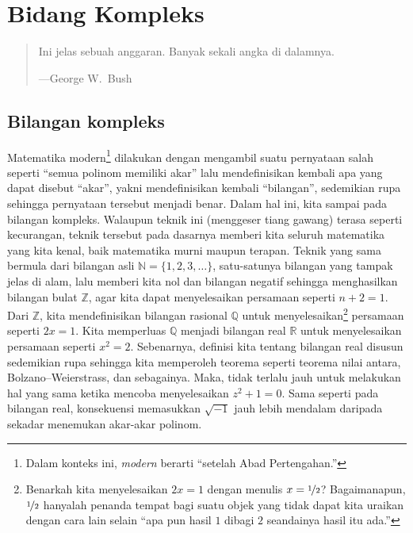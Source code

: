 \documentclass[12pt,openany]{book}
\newcommand{\R}{{\mathbb{R}}}
\newcommand{\Z}{{\mathbb{Z}}}
\newcommand{\N}{{\mathbb{N}}}
\newcommand{\Q}{{\mathbb{Q}}}
\newcommand{\myquote}[1]{``#1''}
\theoremstyle{plain}
\theoremstyle{remark}
\theoremstyle{definition}
\newenvironment{myepigraph}{%
    \begin{quote}%
    \begingroup\itshape
}{%
    \endgroup%
    \end{quote}
}
\theoremstyle{exercise}
\theoremstyle{example}
\begin{document}

\chapter{Bidang Kompleks} \label{ch:complexplane}

\begin{myepigraph}
Ini jelas sebuah anggaran. Banyak sekali angka di dalamnya.

---George W.\ Bush
\end{myepigraph}


\section{Bilangan kompleks} \label{sec:complexnums}

Matematika modern\footnote{Dalam konteks ini, \emph{modern}
berarti \myquote{setelah Abad Pertengahan.}}
dilakukan
dengan mengambil suatu pernyataan salah seperti
\myquote{semua polinom memiliki akar} lalu mendefinisikan kembali apa yang dapat disebut
\myquote{akar}, yakni
mendefinisikan kembali \myquote{bilangan},
sedemikian rupa sehingga pernyataan tersebut menjadi benar.
Dalam hal ini, kita sampai pada bilangan kompleks.
Walaupun teknik ini (menggeser tiang gawang)
terasa seperti kecurangan, teknik tersebut pada dasarnya memberi kita
seluruh matematika yang kita kenal, baik matematika murni maupun terapan.
Teknik yang sama
bermula dari bilangan asli
$\N = \{ 1,2,3,\ldots \}$, satu-satunya
bilangan yang tampak jelas di alam,
lalu memberi kita nol dan bilangan negatif sehingga menghasilkan bilangan bulat
$\Z$, agar kita dapat menyelesaikan persamaan seperti $n+2 = 1$.
Dari $\Z$, kita mendefinisikan bilangan rasional
$\Q$ untuk menyelesaikan\footnote{%
Benarkah kita menyelesaikan $2x=1$ dengan menulis $x = \nicefrac{1}{2}$?  Bagaimanapun,
$\nicefrac{1}{2}$ hanyalah penanda tempat bagi suatu objek yang tidak dapat kita uraikan
dengan cara lain selain
\myquote{apa pun hasil $1$ dibagi $2$ seandainya hasil itu ada.}}
persamaan seperti $2x=1$.  Kita memperluas
$\Q$ menjadi bilangan real $\R$
untuk menyelesaikan persamaan seperti $x^2=2$.  Sebenarnya, definisi kita
tentang bilangan real disusun sedemikian rupa sehingga kita memperoleh teorema seperti
teorema nilai antara, Bolzano--Weierstrass,
dan sebagainya.  Maka, tidak terlalu jauh untuk melakukan hal yang sama ketika mencoba
menyelesaikan $z^2+1=0$.  Sama seperti pada bilangan real,
konsekuensi memasukkan $\sqrt{-1}$ jauh lebih
mendalam daripada sekadar menemukan akar-akar polinom.
\end{document}
